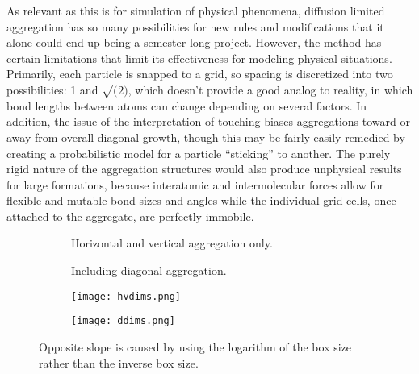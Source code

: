 \documentclass[12pt]{article}
\begin{document}
As relevant as this is for simulation of physical phenomena, diffusion limited aggregation has so many possibilities for new rules and modifications that it alone could end up being a semester long project.
However, the method has certain limitations that limit its effectiveness for modeling physical situations.
Primarily, each particle is snapped to a grid, so spacing is discretized into two possibilities: 1 and $\sqrt(2)$, which doesn't provide a good analog to reality, in which bond lengths between atoms can change depending on several factors.
In addition, the issue of the interpretation of touching biases aggregations toward or away from overall diagonal growth, though this may be fairly easily remedied by creating a probabilistic model for a particle ``sticking'' to another.
The purely rigid nature of the aggregation structures would also produce unphysical results for large formations, because interatomic and intermolecular forces allow for flexible and mutable bond sizes and angles while the individual grid cells, once attached to the aggregate, are perfectly immobile.



\begin{figure}
  \centering

  \begin{subfigure}[b]{0.85\textwidth}
    \caption{Horizontal and vertical aggregation only.}
  \end{subfigure}
  \qquad
  \begin{subfigure}[b]{0.85\textwidth}
    \caption{Including diagonal aggregation.}
  \end{subfigure}

  \caption{}
  \label{hdv}

\end{figure}

\begin{figure}
  \centering
  \vspace{-10mm}

  \begin{subfigure}[b]{0.85\textwidth}
    \texttt{[image: hvdims.png]}
  \end{subfigure}

  \begin{subfigure}[b]{0.85\textwidth}
    \texttt{[image: ddims.png]}
  \end{subfigure}

  \caption{Opposite slope is caused by using the logarithm of the box size rather than the inverse box size.}
  \label{dims}

\end{figure}
\end{document}
